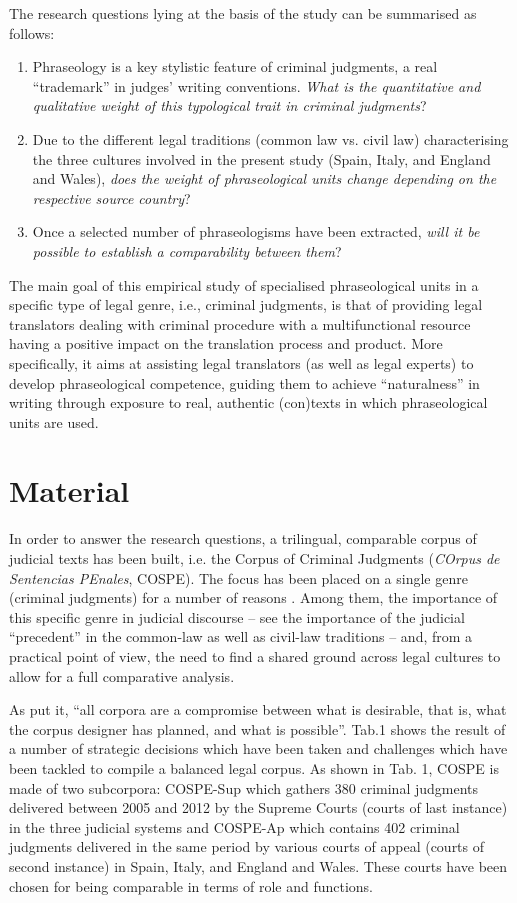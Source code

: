 \documentclass[output=paper]{LSP/langsci}
\begin{document}
The research questions lying at the basis of the study can be summarised as follows:

\begin{enumerate}
\item Phraseology is a key stylistic feature of criminal judgments, a real “trademark” in judges’ writing conventions. \textit{What is the quantitative and qualitative weight of this typological trait in criminal judgments}? 
\item Due to the different legal traditions (common law vs. civil law) characterising the three cultures involved in the present study (Spain, Italy, and England and Wales), \textit{does the weight of phraseological units change depending on the respective source country}? 
\item Once a selected number of phraseologisms have been extracted, \textit{will it be possible to establish a comparability between them}?
\end{enumerate}

The main goal of this empirical study of specialised phraseological units in a specific type of legal genre, i.e., criminal judgments, is that of providing legal translators dealing with criminal procedure with a multifunctional resource having a positive impact on the translation process and product. More specifically, it aims at assisting legal translators (as well as legal experts) to develop phraseological competence, guiding them to achieve “naturalness” in writing through exposure to real, authentic (con)texts in which phraseological units are used.

\section{Material}
In order to answer the research questions, a trilingual, comparable corpus of judicial texts has been built, i.e. the Corpus of Criminal Judgments (\textit{COrpus de Sentencias PEnales}, COSPE). The focus has been placed on a single genre (criminal judgments) for a number of reasons \citep[see][171-181]{Pontrandolfo2013a}. Among them, the importance of this specific genre in judicial discourse – see the importance of the judicial “precedent” in the common-law as well as civil-law traditions – and, from a practical point of view, the need to find a shared ground across legal cultures to allow for a full comparative analysis.

As \citet[156-157]{Hunston2008} put it, “all corpora are a compromise between what is desirable, that is, what the corpus designer has planned, and what is possible”. Tab.1 shows the result of a number of strategic decisions which have been taken and challenges which have been tackled to compile a balanced legal corpus. As shown in Tab. 1, COSPE is made of two subcorpora: COSPE-Sup which gathers 380 criminal judgments delivered between 2005 and 2012 by the Supreme Courts (courts of last instance) in the three judicial systems and COSPE-Ap which contains 402 criminal judgments delivered in the same period by various courts of appeal (courts of second instance) in Spain, Italy, and England and Wales. These courts have been chosen for being comparable in terms of role and functions.
\end{document}
